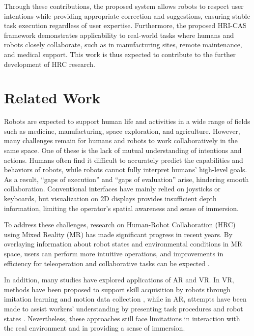 \documentclass[../../main.tex]{subfiles} %
\begin{document}
Through these contributions, the proposed system allows robots to respect user 
intentions while providing appropriate correction and suggestions, 
ensuring stable task execution regardless of user expertise.
Furthermore, the proposed HRI-CAS framework demonstrates applicability 
to real-world tasks where humans and robots closely collaborate, 
such as in manufacturing sites, remote maintenance, and medical support. 
This work is thus expected to contribute to the further development of HRC research.

\section{Related Work}

Robots are expected to support human life and activities in a wide range of 
fields such as medicine, manufacturing, space exploration, and agriculture.  
However, many challenges remain for 
humans and robots to work collaboratively in the same space.  
One of these is the lack of mutual understanding of intentions and actions.  
Humans often find it difficult to accurately predict the capabilities and behaviors of robots,
while robots cannot fully interpret humans’ high-level goals.  
As a result, “gaps of execution” and “gaps of evaluation” arise, hindering smooth collaboration.  
Conventional interfaces have mainly relied on joysticks or keyboards, but visualization on 2D displays 
provides insufficient depth information, 
limiting the operator’s spatial awareness and sense of immersion.

\medskip
\noindent
To address these challenges, research on Human-Robot Collaboration (HRC) using Mixed Reality (MR) 
has made significant progress in recent years.  
By overlaying information about robot states and environmental conditions in MR space, 
users can perform more intuitive operations, 
and improvements in efficiency for teleoperation and collaborative tasks can be expected \cite{MR1} \cite{MR2}.  

\medskip
\noindent
In addition, many studies have explored applications of AR and VR.  
In VR, methods have been proposed to support skill acquisition by robots through 
imitation learning and motion data collection \cite{VR1} \cite{VR2},  
while in AR, attempts have been made to assist workers’ understanding by presenting 
task procedures and robot states \cite{AR1} \cite{AR2}.  
Nevertheless, these approaches still face limitations in interaction with the real 
environment and in providing a sense of immersion.  
\end{document}
